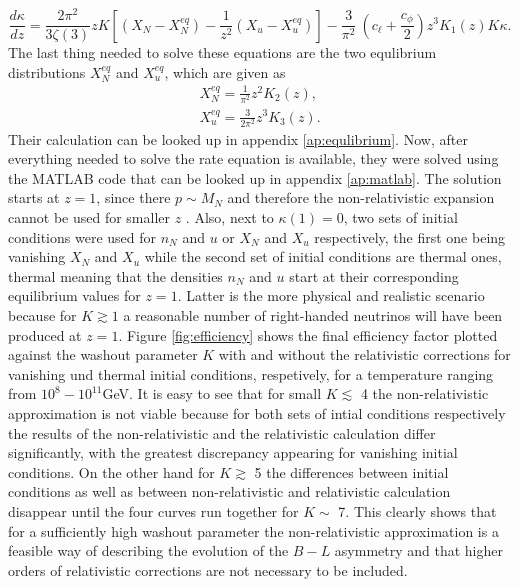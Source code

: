 \begin{equation}
\frac{d\kappa}{dz}=\frac{2\pi^2}{3\zeta(3)}zK\left[\left(X_N-X_N^{eq}\right)-\frac{1}{z^2}\left(X_u-X_u^{eq}\right)\right]-\frac{3}{\pi^2}\:\left(c_\ell+\frac{c_\phi}{2}\right)z^3K_1(z)K\kappa.
\end{equation}
The last thing needed to solve these equations are the two equlibrium distributions $X_N^{eq}$ and $X_u^{eq}$, which are given as
\begin{align}
	X_N^{eq}=\frac{1}{\pi^2}z^2K_2(z),\\
	X_u^{eq}=\frac{3}{2\pi^2}z^3K_3(z).
\end{align}
Their calculation can be looked up in appendix \ref{ap:equlibrium}.\newline \indent
Now, after everything needed to solve the rate equation is available, they were solved using the MATLAB code that can be looked up in appendix \ref{ap:matlab}. The solution starts at $z=1$, since there $p\sim M_N$ and therefore the non-relativistic expansion cannot be used for smaller $z$ \cite[p. 13]{Bodeker:2013qaa}. Also, next to $\kappa(1)=0$, two sets of initial conditions were used for $n_N$ and $u$ or $X_N$ and $X_u$ respectively, the first one being vanishing $X_N$ and $X_u$ while the second set of initial conditions are thermal ones, thermal meaning that the densities $n_N$ and $u$ start at their corresponding equilibrium values for $z=1$. Latter is the more physical and realistic scenario because for $K\gtrsim1$ a reasonable number of right-handed neutrinos will have been produced at $z=1$\cite[p. 13]{Bodeker:2013qaa}. \newline\indent
Figure \ref{fig:efficiency} shows the final efficiency factor plotted against the washout parameter $K$ with and without the relativistic corrections for vanishing und thermal initial conditions, respetively, for a temperature ranging from $10^{8}-10^{11}$GeV. It is easy to see that for small $K\lesssim$ 4 the non-relativistic approximation is not viable because for both sets of intial conditions respectively the results of the non-relativistic and the relativistic calculation differ significantly, with the greatest discrepancy appearing for vanishing initial conditions. On the other hand for $K\gtrsim$ 5 the differences between initial conditions as well as between non-relativistic and relativistic calculation disappear until the four curves run together for $K\sim$ 7. This clearly shows that for a sufficiently high washout parameter the non-relativistic approximation is a feasible way of describing the evolution of the $B-L$ asymmetry and that higher orders of relativistic corrections are not necessary to be included.
